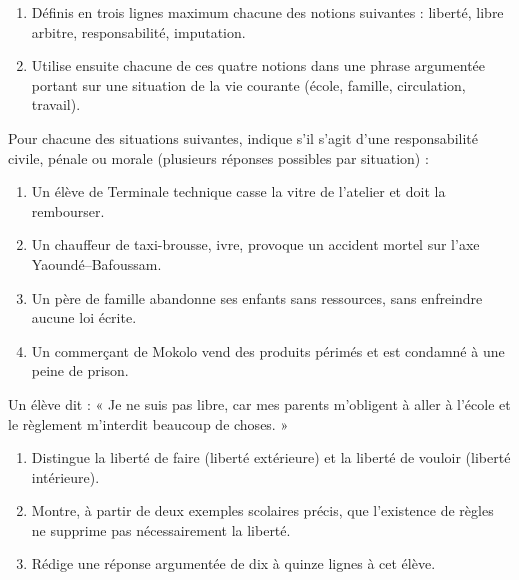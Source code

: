 \documentclass[11pt]{article}
\newcommand{\cle}[1]{{\popxbold\color{popdark}#1}}
\newcounter{popsec}
\newcounter{popsub}
\newcommand{\courssub}[1]{%
  \stepcounter{popsub}%
  \par\vspace{9pt}\noindent{\popxbold\fontsize{11.5}{13}\selectfont\color{popink}{\color{poporange}\thepopsec.\thepopsub}\hspace{6pt}#1}\par\nopagebreak\vspace{4pt}
}
\begin{document}
\begin{exercice}
\begin{enumerate}
\item Définis en trois lignes maximum chacune des notions suivantes : \cle{liberté}, \cle{libre arbitre}, \cle{responsabilité}, \cle{imputation}.
\item Utilise ensuite chacune de ces quatre notions dans une phrase argumentée portant sur une situation de la vie courante (école, famille, circulation, travail).
\end{enumerate}
\end{exercice}

\begin{exercice}
Pour chacune des situations suivantes, indique s'il s'agit d'une responsabilité \cle{civile}, \cle{pénale} ou \cle{morale} (plusieurs réponses possibles par situation) :
\begin{enumerate}
\item Un élève de Terminale technique casse la vitre de l'atelier et doit la rembourser.
\item Un chauffeur de taxi-brousse, ivre, provoque un accident mortel sur l'axe Yaoundé--Bafoussam.
\item Un père de famille abandonne ses enfants sans ressources, sans enfreindre aucune loi écrite.
\item Un commerçant de Mokolo vend des produits périmés et est condamné à une peine de prison.
\end{enumerate}
\end{exercice}

\courssub{Je m'entraîne}

\begin{exercice}
Un élève dit : « Je ne suis pas libre, car mes parents m'obligent à aller à l'école et le règlement m'interdit beaucoup de choses. »
\begin{enumerate}
\item Distingue la \cle{liberté de faire} (liberté extérieure) et la \cle{liberté de vouloir} (liberté intérieure).
\item Montre, à partir de deux exemples scolaires précis, que l'existence de règles ne supprime pas nécessairement la liberté.
\item Rédige une réponse argumentée de dix à quinze lignes à cet élève.
\end{enumerate}
\end{exercice}
\end{document}
